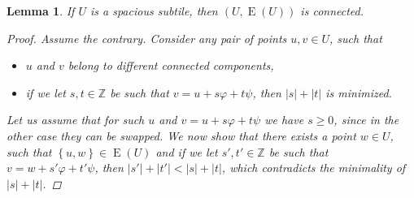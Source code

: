 \documentclass[11pt, letterpaper]{article}
\theoremstyle{plain}
\newtheorem{lemma}{Lemma}
\theoremstyle{definition}
\theoremstyle{remark}
\newcommand{\Z}{\mathbb{Z}}
\renewcommand{\phi}{\varphi}
\newcommand{\set}[1]{\left\lbrace #1 \right\rbrace}
\DeclareMathOperator*{\Edges}{E}
\begin{document}
\begin{lemma}\label{lattice_graph_connectivity}
	If $U$ is a spacious subtile, then $(U, \Edges(U))$ is connected.
	\begin{proof}
		Assume the contrary.
		Consider any pair of points $u, v \in U$, such that
		\begin{itemize}
			\item $u$ and $v$ belong to different connected components,
			\item if we let $s, t \in \Z$ be such that $v = u + s \phi + t \psi$, then $|s| + |t|$ is minimized.
		\end{itemize}
		Let us assume that for such $u$ and $v = u + s \phi + t \psi$ we have $s \ge 0$, since in the other case they can be swapped.
		We now show that there exists a point $w \in U$, such that $\set{u, w} \in \Edges(U)$ and if we let $s', t' \in \Z$ be such that $v = w + s'\phi + t'\psi$, then $|s'| + |t'| < |s| + |t|$, which contradicts the minimality of $|s| + |t|$. 
	

\end{proof}
\end{lemma}
\end{document}
